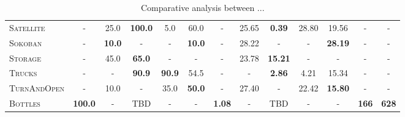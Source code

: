 \documentclass[11pt,landscape]{article}
\begin{document}
\begin{table*}[tb]
{\begin{tabular}{|l||ccccc||ccccc||c||c||}
\textsc{Satellite}&-&25.0&\textbf{100.0}&5.0&60.0&-&25.65&\textbf{0.39}&28.80&19.56&-&-\\
\textsc{Sokoban}&-&\textbf{10.0}&-&-&\textbf{10.0}&-&28.22&-&-&\textbf{28.19}&-&-\\
\textsc{Storage}&-&45.0&\textbf{65.0}&-&-&-&23.78&\textbf{15.21}&-&-&-&-\\
\textsc{Trucks}&-&-&\textbf{90.9}&\textbf{90.9}&54.5&-&-&\textbf{2.86}&4.21&15.34&-&-\\
\textsc{TurnAndOpen}&-&10.0&-&35.0&\textbf{50.0}&-&27.40&-&22.42&\textbf{15.80}&-&-\\
\textsc{Bottles}&\textbf{100.0}&-&TBD&-&-&\textbf{1.08}&-&TBD&-&-&\textbf{166}&\textbf{628}
\\\hline

        \end{tabular}}
        \caption{Comparative analysis between ...}
        \label{tab:experiments}
        \end{table*}
        
\end{document}
